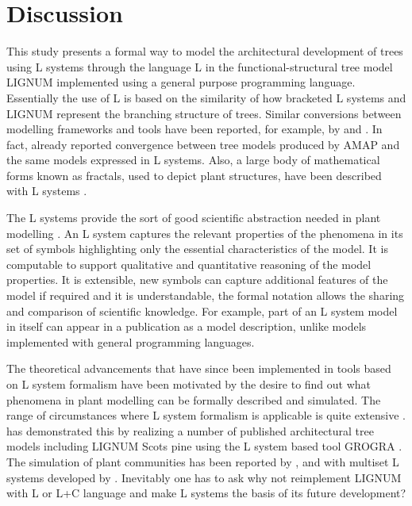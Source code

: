 \section{Discussion}

This  study   presents  a  formal  way  to   model  the  architectural
development of  trees using  L systems through  the language L  in the
functional-structural  tree model LIGNUM  implemented using  a general
purpose programming  language.  Essentially the  use of L is  based on
the similarity  of how  bracketed L systems  and LIGNUM  represent the
branching structure  of trees.  Similar  conversions between modelling
frameworks   and   tools  have   been   reported,   for  example,   by
\citet{ferraro:02}   and   \citet{dzierzon:03}.    In  fact,   already
\citet{kurth:94b} reported  convergence between tree  models produced
by AMAP  and the same  models expressed in  L systems.  Also,  a large
body of  mathematical forms  known as fractals,  used to  depict plant
structures, have been described with L systems \citep{kurth:99}.

The L systems  provide the sort of good  scientific abstraction needed
in plant modelling \citep[c.f.][]{regev:02}.  An L system captures the
relevant  properties   of  the  phenomena   in  its  set   of  symbols
highlighting only  the essential characteristics of the  model.  It is
computable to  support qualitative  and quantitative reasoning  of the
model  properties.    It  is  extensible,  new   symbols  can  capture
additional features of the model if required and it is understandable,
the formal  notation allows the  sharing and comparison  of scientific
knowledge.   For example,  part of  an L  system model  in  itself can
appear  in  a  publication  as  a  model  description,  unlike  models
implemented with general programming languages.

The theoretical advancements that have since been implemented in tools
based on L system formalism have been  motivated by the desire to find
out what phenomena  in plant modelling can  be  formally described and
simulated.  The range  of circumstances  where  L system  formalism is
applicable is   quite extensive  \citep{pp:99}.  \citet{kurth:99}  has
demonstrated  this  by realizing  a number  of published architectural
tree models including LIGNUM Scots pine \citep{perttunen:96} using the
L system based  tool GROGRA \citep{kurth:94}.  The simulation of plant
communities  has been reported by \citet{deussen:98}, \citet{kurth:99}
and with multiset L systems  developed by \citet{lane:02}.  Inevitably
one  has  to ask why  not  reimplement LIGNUM with   L or L+C language
\citep{karwowski:02} and make  L   systems  the basis  of   its future
development?

